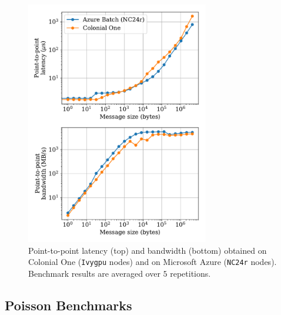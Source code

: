 \documentclass[10pt,journal,compsoc]{IEEEtran}
\begin{document}
\begin{figure}[!h]
    \centering
    \includegraphics[width=8cm]{figures/osu_latency_bandwidth.pdf}
    \caption{Point-to-point latency (top) and bandwidth (bottom) obtained on Colonial One (\texttt{Ivygpu} nodes) and on Microsoft Azure (\texttt{NC24r} nodes). Benchmark results are averaged over $5$ repetitions.}
    \label{fig:osu_benchmarks}
\end{figure}

\subsection{Poisson Benchmarks}\label{subsec:poisson_benchmarks}
\end{document}
